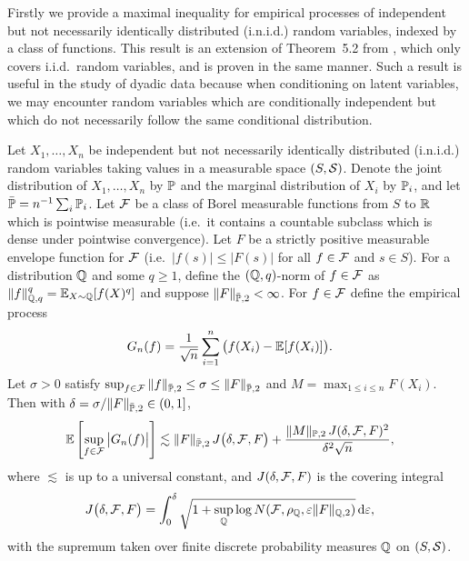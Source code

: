 Firstly we provide a maximal inequality
for empirical processes of
independent but not necessarily identically distributed
(i.n.i.d.)
random variables,
indexed by a class of functions.
This result is an extension
of Theorem~5.2 from \citet{chernozhukov2014gaussian},
which only covers i.i.d.\ random variables,
and is proven in the same manner.
Such a result is useful in the study of dyadic data
because when conditioning on latent variables,
we may encounter
random variables which are conditionally independent
but which do not necessarily follow the same
conditional distribution.

\begin{lemma}
  \label{lem:kernel_app_maximal_entropy}

  Let $X_1, \dots, X_n$
  be independent but not necessarily identically distributed
  (i.n.i.d.)
  random variables taking values in a
  measurable space $(S,\cS)$.
  Denote the joint distribution of
  $X_1,\ldots,X_n$ by $\P$
  and the marginal distribution of
  $X_i$ by $\P_i$,
  and let $\bar\P = n^{-1} \sum_i \P_i$.
  Let $\cF$ be a class of Borel measurable functions
  from $S$ to $\R$
  which is pointwise measurable
  (i.e.\ it contains a countable subclass which
  is dense under pointwise convergence).
  Let $F$ be a strictly positive
  measurable envelope function for $\cF$
  (i.e.\ $|f(s)| \leq |F(s)|$ for all $f \in \cF$
  and $s \in S$).
  For a distribution $\Q$ and some $q \geq 1$,
  define the $(\Q,q)$-norm of $f \in \cF$ as
  $\|f\|_{\Q,q}^q = \E_{X \sim \Q}[f(X)^q]$
  and suppose
  $\|F\|_{\bar\P,2} < \infty$.
  For $f \in \cF$
  define the empirical process
  \begin{align*}
    G_n(f)
    &=
    \frac{1}{\sqrt n}
    \sum_{i=1}^n
    \big(
      f(X_i) - \E[f(X_i)]
    \big).
  \end{align*}
  Let $\sigma > 0$ satisfy
  $\sup_{f \in \cF}
  \|f\|_{\bar\P,2}
  \leq
  \sigma
  \leq
  \|F\|_{\bar\P,2}$
  and
  $M = \max_{1 \leq i \leq n} F(X_i)$.
  Then with
  $\delta = \sigma / \|F\|_{\bar\P,2} \in (0,1]$,
  \begin{align*}
    \E \left[
      \sup_{f \in \cF}
      \big| G_n(f) \big|
    \right]
    &\lesssim
    \|F\|_{\bar\P,2}
    \, J\big(\delta, \cF, F \big)
    +
    \frac{\|M\|_{\P,2} \, J(\delta, \cF, F)^2}{\delta^2 \sqrt{n}},
  \end{align*}
  where $\lesssim$ is up to a universal constant,
  and $J(\delta, \cF, F)$ is the covering integral
  \begin{align*}
    J\big(\delta, \cF, F\big)
    &=
    \int_0^\delta
    \sqrt{1 +
    \sup_\Q \log N(\cF, \rho_\Q, \varepsilon \|F\|_{\Q,2})}
    \diff{\varepsilon},
  \end{align*}
  with the supremum taken over finite discrete probability
  measures $\Q$ on $(S, \cS)$.

\end{lemma}


